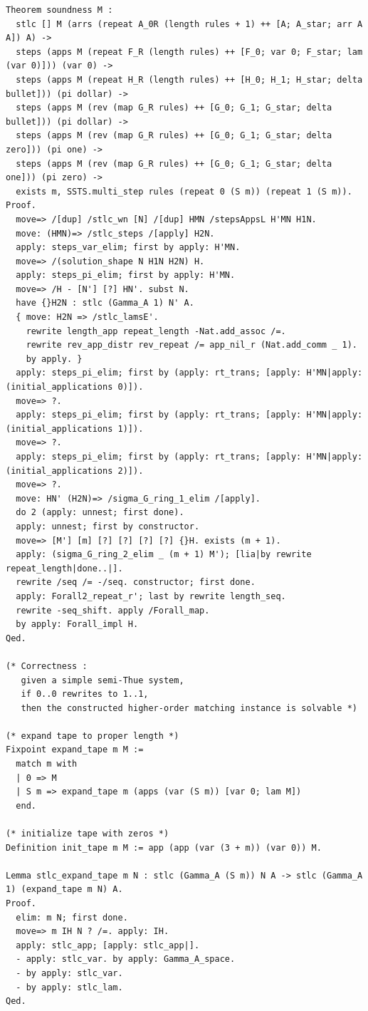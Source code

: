\documentclass[10pt,a4paper]{amsart}
\begin{document}
\begin{lstlisting}
Theorem soundness M :
  stlc [] M (arrs (repeat A_0R (length rules + 1) ++ [A; A_star; arr A A]) A) ->
  steps (apps M (repeat F_R (length rules) ++ [F_0; var 0; F_star; lam (var 0)])) (var 0) ->
  steps (apps M (repeat H_R (length rules) ++ [H_0; H_1; H_star; delta bullet])) (pi dollar) ->
  steps (apps M (rev (map G_R rules) ++ [G_0; G_1; G_star; delta bullet])) (pi dollar) ->
  steps (apps M (rev (map G_R rules) ++ [G_0; G_1; G_star; delta zero])) (pi one) ->
  steps (apps M (rev (map G_R rules) ++ [G_0; G_1; G_star; delta one])) (pi zero) ->
  exists m, SSTS.multi_step rules (repeat 0 (S m)) (repeat 1 (S m)).
Proof.
  move=> /[dup] /stlc_wn [N] /[dup] HMN /stepsAppsL H'MN H1N.
  move: (HMN)=> /stlc_steps /[apply] H2N.
  apply: steps_var_elim; first by apply: H'MN.
  move=> /(solution_shape N H1N H2N) H.
  apply: steps_pi_elim; first by apply: H'MN.
  move=> /H - [N'] [?] HN'. subst N.
  have {}H2N : stlc (Gamma_A 1) N' A.
  { move: H2N => /stlc_lamsE'.
    rewrite length_app repeat_length -Nat.add_assoc /=.
    rewrite rev_app_distr rev_repeat /= app_nil_r (Nat.add_comm _ 1).
    by apply. }
  apply: steps_pi_elim; first by (apply: rt_trans; [apply: H'MN|apply: (initial_applications 0)]).
  move=> ?.
  apply: steps_pi_elim; first by (apply: rt_trans; [apply: H'MN|apply: (initial_applications 1)]).
  move=> ?.
  apply: steps_pi_elim; first by (apply: rt_trans; [apply: H'MN|apply: (initial_applications 2)]).
  move=> ?.
  move: HN' (H2N)=> /sigma_G_ring_1_elim /[apply].
  do 2 (apply: unnest; first done).
  apply: unnest; first by constructor.
  move=> [M'] [m] [?] [?] [?] [?] {}H. exists (m + 1).
  apply: (sigma_G_ring_2_elim _ (m + 1) M'); [lia|by rewrite repeat_length|done..|].
  rewrite /seq /= -/seq. constructor; first done.
  apply: Forall2_repeat_r'; last by rewrite length_seq.
  rewrite -seq_shift. apply /Forall_map.
  by apply: Forall_impl H.
Qed.

(* Correctness :
   given a simple semi-Thue system,
   if 0..0 rewrites to 1..1,
   then the constructed higher-order matching instance is solvable *)

(* expand tape to proper length *)
Fixpoint expand_tape m M :=
  match m with
  | 0 => M
  | S m => expand_tape m (apps (var (S m)) [var 0; lam M])
  end.

(* initialize tape with zeros *)
Definition init_tape m M := app (app (var (3 + m)) (var 0)) M.

Lemma stlc_expand_tape m N : stlc (Gamma_A (S m)) N A -> stlc (Gamma_A 1) (expand_tape m N) A.
Proof.
  elim: m N; first done.
  move=> m IH N ? /=. apply: IH.
  apply: stlc_app; [apply: stlc_app|].
  - apply: stlc_var. by apply: Gamma_A_space.
  - by apply: stlc_var.
  - by apply: stlc_lam.
Qed.


\end{lstlisting}
\end{document}
